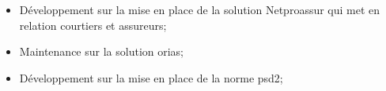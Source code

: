 
\begin{itemize}%
  \item Développement sur la mise en place de la solution Netproassur qui met en relation courtiers et assureurs;%
  \item Maintenance sur la solution orias;%
  \item Développement sur la mise en place de la norme psd2;%
\end{itemize}%

